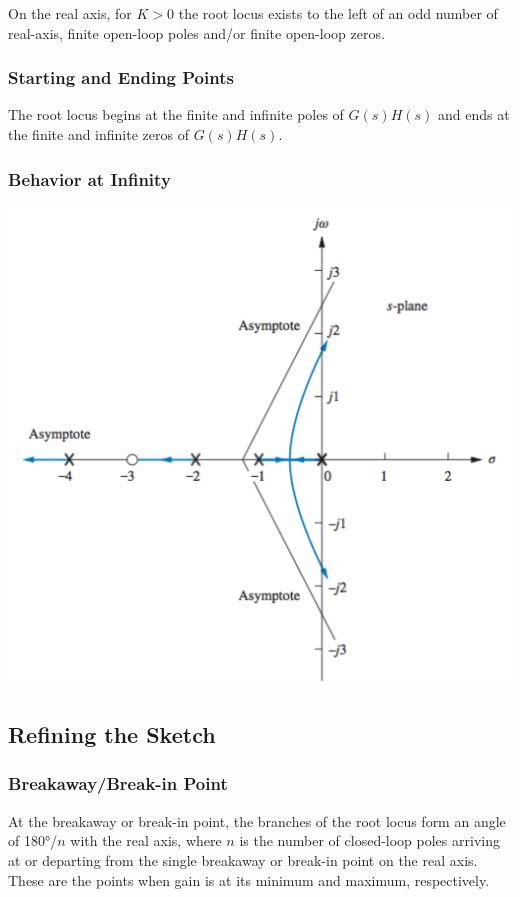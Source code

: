 \documentclass[11pt]{article}
\begin{document}
    On the real axis, for $K > 0$ the root locus exists to the left of an odd number of real-axis, finite open-loop poles and/or finite open-loop zeros.

    \subsubsection{Starting and Ending Points}

    The root locus begins at the finite and infinite poles of $G(s)H(s)$ and ends at the finite and infinite zeros of $G(s)H(s)$.

    \subsubsection{Behavior at Infinity}

    \begin{center}
    \includegraphics[width=300 px]{img/asymptotes} \\
    \end{center}

    \subsection{Refining the Sketch}

    \subsubsection{Breakaway/Break-in Point}

    At the breakaway or break-in point, the branches of the root locus form an angle of 180°/$n$ with the real axis, where $n$ is the number of closed-loop poles arriving at or departing from the single breakaway or break-in point on the real axis. These are the points when gain is at its minimum and maximum, respectively. \\
        
\end{document}
